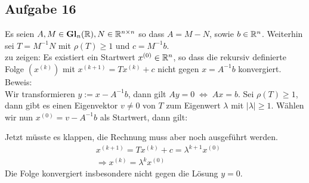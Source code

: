\subsection*{Aufgabe 16}

Es seien $A,M \in \mathbf{Gl}_n(\mathbb R), N \in \mathbb R^{n\times n}$ so dass $A=M-N$, sowie $b \in \mathbb R^n$. Weiterhin sei $T=M^{-1}N$ mit $\rho(T)\ge 1$ und $c=M^{-1}b$.\\
zu zeigen: Es existiert ein Startwert $x^{(0)} \in \mathbb R^n$, so dass die rekursiv definierte Folge $(x^{(k)})$ mit $x^{(k+1)}=Tx^{(k)}+c$ nicht gegen $x=A^{-1}b$ konvergiert.\\
Beweis:\\
Wir transformieren $y := x - A^{-1} b$, dann gilt $A y = 0 \; \Leftrightarrow \; A x = b$.
Sei $\rho(T)\ge 1$, dann gibt es einen Eigenvektor $v \neq 0$ von $T$ zum Eigenwert $\lambda$ mit $|\lambda|\ge 1$. Wählen wir nun $x^{(0)} = v-A^{-1}b$ als Startwert, dann gilt:

Jetzt müsste es klappen, die Rechnung muss aber noch ausgeführt werden.
\begin{align*}
&x^{(k+1)}=Tx^{(k)}+ {c}=\lambda^{k+1}x^{(0)}\\
&\Rightarrow x^{(k)}=\lambda^kx^{(0)}
\end{align*}
Die Folge konvergiert insbesondere nicht gegen die Lösung $y = 0$.\\
